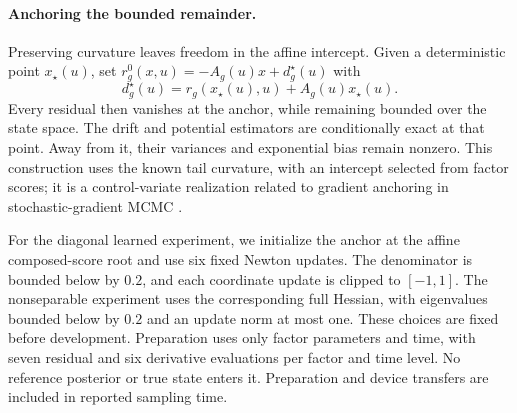 \paragraph{Anchoring the bounded remainder.}
Preserving curvature leaves freedom in the affine intercept. Given a deterministic point $x_\star(u)$, set $r_g^0(x,u)=-A_g(u)x+d_g^\star(u)$ with
\[
d_g^\star(u)=r_g(x_\star(u),u)+A_g(u)x_\star(u).
\]
Every residual then vanishes at the anchor, while remaining bounded over the state space. The drift and potential estimators are conditionally exact at that point. Away from it, their variances and exponential bias remain nonzero. This construction uses the known tail curvature, with an intercept selected from factor scores; it is a control-variate realization related to gradient anchoring in stochastic-gradient MCMC \citep{baker2019}.

For the diagonal learned experiment, we initialize the anchor at the affine composed-score root and use six fixed Newton updates. The denominator is bounded below by $0.2$, and each coordinate update is clipped to $[-1,1]$. The nonseparable experiment uses the corresponding full Hessian, with eigenvalues bounded below by $0.2$ and an update norm at most one. These choices are fixed before development. Preparation uses only factor parameters and time, with seven residual and six derivative evaluations per factor and time level. No reference posterior or true state enters it. Preparation and device transfers are included in reported sampling time.
